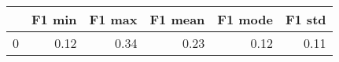 \begin{tabular}{lrrrrr}
\toprule
{} &  F1 min &  F1 max &  F1 mean &  F1 mode &  F1 std \\
\midrule
0 &    0.12 &    0.34 &     0.23 &     0.12 &    0.11 \\
\bottomrule
\end{tabular}
